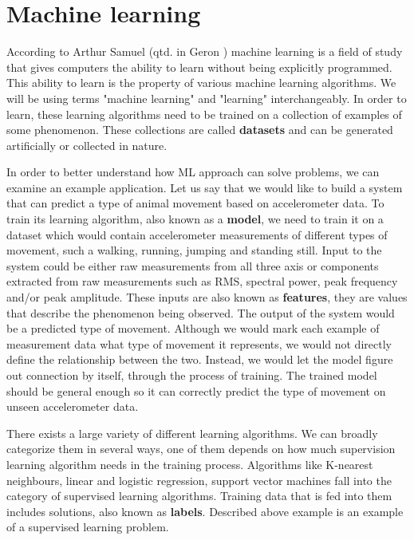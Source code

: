 \section{ Machine learning}

According to Arthur Samuel (qtd. in Geron \cite{geron}) machine learning is a field of study that gives computers the ability to learn without being explicitly programmed.
This ability to learn is the property of various machine learning algorithms.
We will be using terms "machine learning" and "learning" interchangeably. 
In order to learn, these learning algorithms need to be trained on a collection of examples of some phenomenon\cite{burkovml}. 
These collections are called \textbf{datasets} and can be generated artificially or collected in nature.

In order to better understand how ML approach can solve problems, we can examine an example application.
Let us say that we would like to build a system that can predict a type of animal movement based on accelerometer data.
To train its learning algorithm, also known as a \textbf{model}, we need to train it on a dataset which would contain accelerometer measurements of different types of movement, such a walking, running, jumping and standing still.
Input to the system could be either raw measurements from all three axis or components extracted from raw measurements such as RMS, spectral power, peak frequency and/or peak amplitude. 
These inputs are also known as \textbf{features}, they are values that describe the phenomenon being observed\cite{burkovml}. 
The output of the system would be a predicted type of movement.
Although we would mark each example of measurement data what type of movement it represents, we would not directly define the relationship between the two.
Instead, we would let the model figure out connection by itself, through the process of training.
The trained model should be general enough so it can correctly predict the type of movement on unseen accelerometer data.

There exists a large variety of different learning algorithms. 
We can broadly categorize them in several ways, one of them depends on how much supervision learning algorithm needs in the training process. 
Algorithms like K-nearest neighbours, linear and logistic regression, support vector machines fall into the category of supervised learning algorithms.
Training data that is fed into them includes solutions, also known as \textbf{labels}\cite{geron}.
Described above example is an example of a supervised learning problem.

